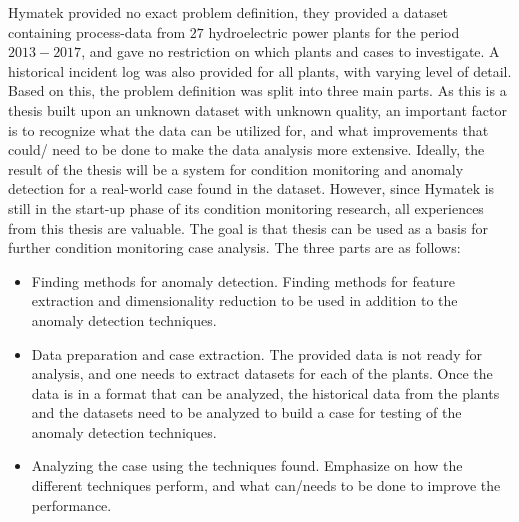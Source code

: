 
Hymatek provided no exact problem definition, they provided a dataset containing process-data from $27$ hydroelectric power plants for the period $2013-2017$, and gave no restriction on which plants and cases to investigate. A historical incident log was also provided for all plants, with varying level of detail. Based on this, the problem definition was split into three main parts. As this is a thesis built upon an unknown dataset with unknown quality, an important factor is to recognize what the data can be utilized for, and what improvements that could/ need to be done to make the data analysis more extensive. Ideally, the result of the thesis will be a system for condition monitoring and anomaly detection for a real-world case found in the dataset. However, since Hymatek is still in the start-up phase of its condition monitoring research, all experiences from this thesis are valuable. The goal is that thesis can be used as a basis for further condition monitoring case analysis. The three parts are as follows: 

\begin{itemize}
    \item Finding methods for anomaly detection. Finding methods for feature extraction and dimensionality reduction to be used in addition to the anomaly detection techniques.
    \item Data preparation and case extraction. The provided data is not ready for analysis, and one needs to extract datasets for each of the plants. Once the data is in a format that can be analyzed, the historical data from the plants and the datasets need to be analyzed to build a case for testing of the anomaly detection techniques. 
    \item Analyzing the case using the techniques found. Emphasize on how the different techniques perform, and what can/needs to be done to improve the performance. 
\end{itemize}


    

